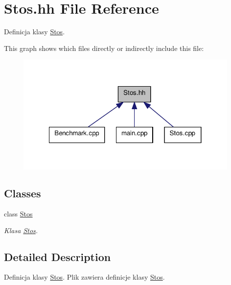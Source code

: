\hypertarget{a00016}{\section{Stos.\-hh File Reference}
\label{a00016}
}


Definicja klasy \hyperlink{a00005}{Stos}.  


This graph shows which files directly or indirectly include this file\-:\nopagebreak
\begin{figure}[H]
\begin{center}
\leavevmode
\includegraphics[width=312pt]{a00030}
\end{center}
\end{figure}
\subsection*{Classes}
\begin{DoxyCompactItemize}
\item 
class \hyperlink{a00005}{Stos}
\begin{DoxyCompactList}\small\item\em Klasa \hyperlink{a00005}{Stos}. \end{DoxyCompactList}\end{DoxyCompactItemize}


\subsection{Detailed Description}
Definicja klasy \hyperlink{a00005}{Stos}. Plik zawiera definicje klasy \hyperlink{a00005}{Stos}. 